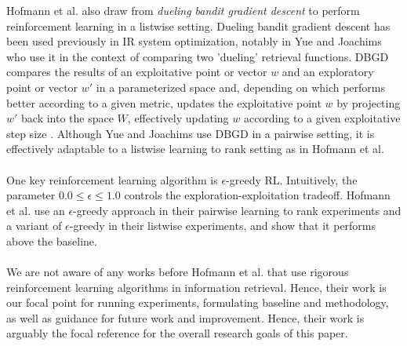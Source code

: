 \documentclass{acm_proc_article-sp}
\begin{document}
Hofmann et al. \cite{hofmann} also draw from \emph{dueling bandit gradient descent} to perform reinforcement learning in a listwise setting.  Dueling bandit gradient descent has been used previously in IR system optimization, notably in Yue and Joachims \cite{yue} who use it in the context of comparing two 'dueling' retrieval functions.  DBGD compares the results of an exploitative point or vector $w$ and an exploratory point or vector $w'$ in a parameterized space and, depending on which performs better according to a given metric, updates the exploitative point $w$ by projecting $w'$ back into the space $W$, effectively updating $w$ according to a given exploitative step size \cite{yue}.  Although Yue and Joachims \cite{yue} use DBGD in a pairwise setting, it is effectively adaptable to a listwise learning to rank setting as in Hofmann et al. \cite{hofmann} \\ \\
One key reinforcement learning algorithm is $\epsilon$-greedy RL. Intuitively, the parameter $0.0 \leq \epsilon \leq 1.0$ controls the exploration-exploitation tradeoff. Hofmann et al. \cite{hofmann} use an $\epsilon$-greedy approach in their pairwise  learning to rank experiments and a variant of $\epsilon$-greedy in their listwise experiments, and show that it performs above the baseline.  \\ \\ 
We are not aware of any works before Hofmann et al. \cite{hofmann} that use rigorous reinforcement learning algorithms in information retrieval. Hence, their work is our focal point for running experiments, formulating baseline and methodology, as well as guidance for future work and improvement. Hence, their work is arguably the focal reference for the overall research goals of this paper. \\ \\
\end{document}
